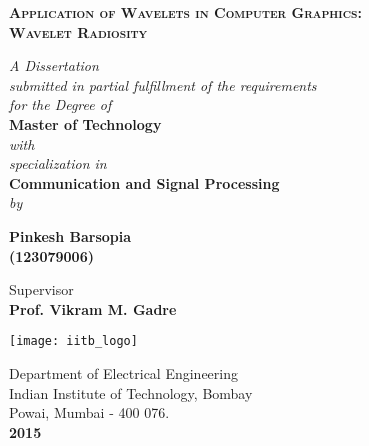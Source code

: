 \begin{center}
\begin{center}
    \Large{\textsc{\textbf{Application of Wavelets in Computer Graphics: \\Wavelet Radiosity}}} \\[0.5cm]
\end{center}
    
\vspace{0.5cm}
\textit{A Dissertation}\\
\textit{submitted in partial fulfillment of the requirements\\ for the Degree of} \\
\vspace{0.5cm} 
\textbf{Master of Technology}\\
\vspace{0.5cm}
 \textit{with \\specialization in}\\
 \vspace{0.5cm}
  \textbf{Communication and Signal Processing}\\
\vspace{0.5cm} \textit{by}\\


    \begin{center}
    \textbf{Pinkesh Barsopia}\\
    \textbf{(123079006)}\\
    \end{center}

\vspace{1cm}
Supervisor\\[0.5cm]
{\textbf {Prof. Vikram M. Gadre}}\\[1.5cm]

\begin{center}
\texttt{[image: iitb\_logo]}
\end{center}

Department of Electrical Engineering\\
Indian Institute of Technology, Bombay\\
Powai, Mumbai - 400 076.\\[0.5cm]
\textbf{2015}
\end{center} 